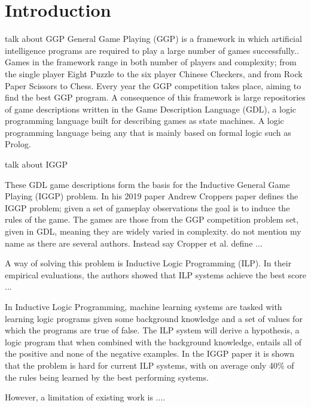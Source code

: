 
\chapter{Introduction}
\ac{talk about GGP}
General Game Playing (GGP) is a framework in which artificial intelligence programs are required to play a large number of games successfully.\cite{Genesereth/GGPOverview}.
Games in the framework range in both number of players and complexity; from the single player Eight Puzzle to the six player Chinese Checkers, and from Rock Paper Scissors to Chess\cite{GGP-Website}. Every year the GGP competition takes place, aiming to find the best GGP program. A consequence of this framework is large repositories of game descriptions written in the Game Description Language (GDL), a logic programming language built for describing games as state machines\cite{GDL_Spec}. A logic programming language being any that is mainly based on formal logic such as Prolog.


\ac{talk about IGGP}

These GDL game descriptions form the basis for the Inductive General Game Playing (IGGP) problem. In his 2019 paper Andrew Croppers paper \cite{Cropper/IGGP} defines the IGGP problem; given a set of gameplay observations the goal is to induce the rules of the game. The games are those from the GGP competition problem set, given in GDL, meaning they are widely varied in complexity.
\ac{do not mention my name as there are several authors. Instead say Cropper et al. define ...}


A way of solving this problem is Inductive Logic Programming (ILP).
\ac{In their empirical evaluations, the authors showed that ILP systems achieve the best score ... }

In Inductive Logic Programming, machine learning systems are tasked with learning logic programs given some background knowledge and a set of values for which the programs are true of false. The ILP system will derive a hypothesis, a logic program that when combined with the background knowledge, entails all of the positive and none of the negative examples\cite{Muggleton/ILP}. In the IGGP paper it is shown that the problem is hard for current ILP systems, with on average only 40\% of the rules being learned by the best performing systems.

\ac{However, a limitation of existing work is ....}


